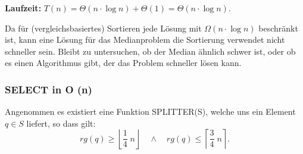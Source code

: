 \textbf{Laufzeit: } $T(n) = \Theta (n \cdot \log n) + \Theta(1) = \Theta(n \cdot \log n)$.

\vspace{\baselineskip}

Da für (vergleichsbasiertes) Sortieren jede Lösung mit $\Omega (n \cdot \log n)$ beschränkt ist, kann eine Lösung für das Medianproblem die Sortierung verwendet nicht schneller sein. Bleibt zu untersuchen, ob der Median ähnlich schwer ist, oder ob es einen Algorithmus gibt, der das Problem schneller lösen kann.

\subsubsection{SELECT in O (n)}

Angenommen es existiert eine Funktion SPLITTER(S), welche uns ein Element $q\in S$ liefert, so dass gilt:\\
$$rg(q) \geq \left\lfloor \frac{1}{4} \; n \right\rfloor \quad \land \quad rg(q) \leq \left\lceil \frac{3}{4} \; n\right\rceil.$$

